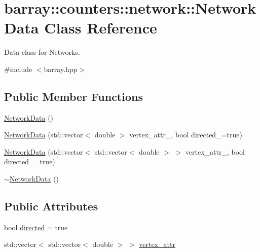 \hypertarget{classbarray_1_1counters_1_1network_1_1_network_data}{}\section{barray\+:\+:counters\+:\+:network\+:\+:Network\+Data Class Reference}
\label{classbarray_1_1counters_1_1network_1_1_network_data}


Data class for Networks.  




{\ttfamily \#include $<$barray.\+hpp$>$}

\subsection*{Public Member Functions}
\begin{DoxyCompactItemize}
\item 
\hyperlink{classbarray_1_1counters_1_1network_1_1_network_data_a69ef8781e9824ac241e787cbf3b7b61b}{Network\+Data} ()
\item 
\hyperlink{classbarray_1_1counters_1_1network_1_1_network_data_a35b1da1bb7d8e6322d236d459719b5a4}{Network\+Data} (std\+::vector$<$ double $>$ vertex\+\_\+attr\+\_\+, bool directed\+\_\+=true)
\item 
\hyperlink{classbarray_1_1counters_1_1network_1_1_network_data_a5b955ab3e893518e0dbe174665b6f221}{Network\+Data} (std\+::vector$<$ std\+::vector$<$ double $>$ $>$ vertex\+\_\+attr\+\_\+, bool directed\+\_\+=true)
\item 
\hyperlink{classbarray_1_1counters_1_1network_1_1_network_data_afd856418969b048fd18304877d6e4bed}{$\sim$\+Network\+Data} ()
\end{DoxyCompactItemize}
\subsection*{Public Attributes}
\begin{DoxyCompactItemize}
\item 
bool \hyperlink{classbarray_1_1counters_1_1network_1_1_network_data_a43001a7fe5f55186e2dbeea68fa57c71}{directed} = true
\item 
std\+::vector$<$ std\+::vector$<$ double $>$ $>$ \hyperlink{classbarray_1_1counters_1_1network_1_1_network_data_adada150198dbde793c5ebe56e15c2f54}{vertex\+\_\+attr}
\end{DoxyCompactItemize}


